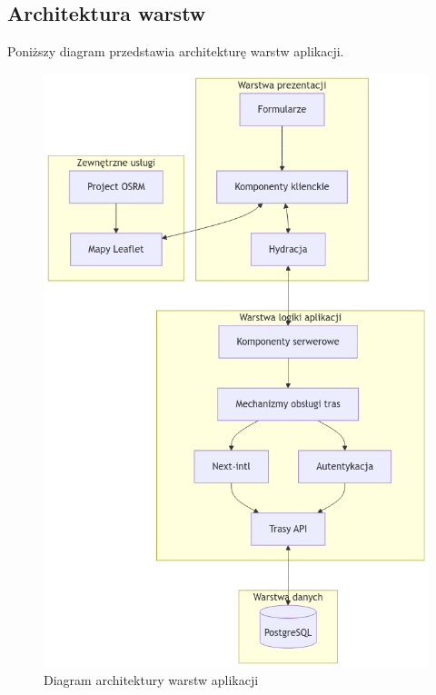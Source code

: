 \subsection{Architektura warstw}
Poniższy diagram przedstawia architekturę warstw aplikacji. 
\begin{figure}[H]
	\centering
		\includegraphics[width=0.7\linewidth]{rozdzial2/diagram_warstw.png}
	\caption{Diagram architektury warstw aplikacji}
	\label{Diagram warstw}
\end{figure}

